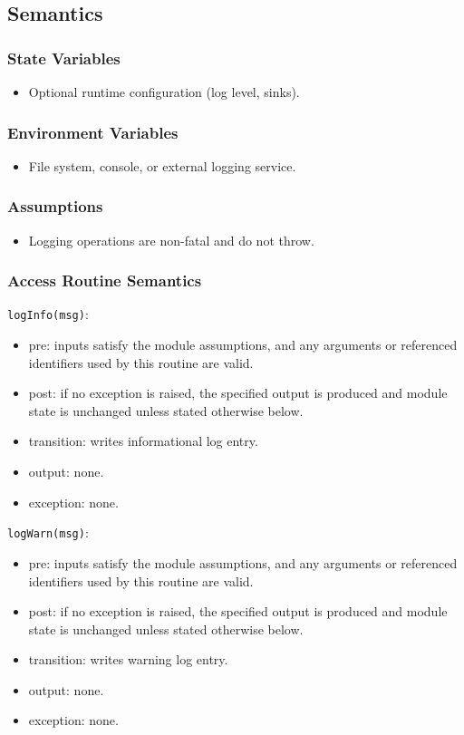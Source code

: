 \documentclass[12pt, titlepage]{article}
\begin{document}
\subsection{Semantics}

\subsubsection{State Variables}
\begin{itemize}
    \item Optional runtime configuration (log level, sinks).
\end{itemize}

\subsubsection{Environment Variables}
\begin{itemize}
    \item File system, console, or external logging service.
\end{itemize}

\subsubsection{Assumptions}
\begin{itemize}
    \item Logging operations are non-fatal and do not throw.
\end{itemize}

\subsubsection{Access Routine Semantics}

\noindent \texttt{logInfo(msg)}:
\begin{itemize}
    \item pre: inputs satisfy the module assumptions, and any arguments or referenced identifiers used by this routine are valid.
    \item post: if no exception is raised, the specified output is produced and module state is unchanged unless stated otherwise below.
    \item transition: writes informational log entry.
    \item output: none.
    \item exception: none.
\end{itemize}

\noindent \texttt{logWarn(msg)}:
\begin{itemize}
    \item pre: inputs satisfy the module assumptions, and any arguments or referenced identifiers used by this routine are valid.
    \item post: if no exception is raised, the specified output is produced and module state is unchanged unless stated otherwise below.
    \item transition: writes warning log entry.
    \item output: none.
    \item exception: none.
\end{itemize}
\end{document}
